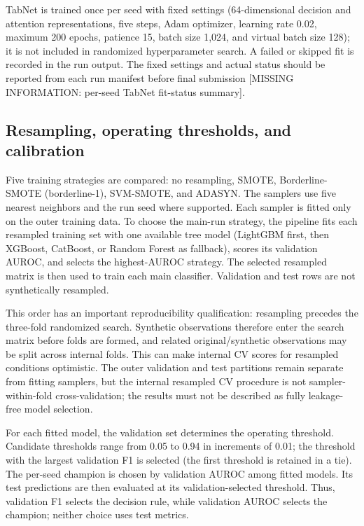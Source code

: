 \documentclass[pdflatex,sn-mathphys-num]{sn-jnl}
\begin{document}
TabNet is trained once per seed with fixed settings (64-dimensional decision and attention representations, five steps, Adam optimizer, learning rate 0.02, maximum 200 epochs, patience 15, batch size 1,024, and virtual batch size 128); it is not included in randomized hyperparameter search. A failed or skipped fit is recorded in the run output. The fixed settings and actual status should be reported from each run manifest before final submission [MISSING INFORMATION: per-seed TabNet fit-status summary].

\subsection{Resampling, operating thresholds, and calibration}
Five training strategies are compared: no resampling, SMOTE, Borderline-SMOTE (borderline-1), SVM-SMOTE, and ADASYN. The samplers use five nearest neighbors and the run seed where supported. Each sampler is fitted only on the outer training data. To choose the main-run strategy, the pipeline fits each resampled training set with one available tree model (LightGBM first, then XGBoost, CatBoost, or Random Forest as fallback), scores its validation AUROC, and selects the highest-AUROC strategy. The selected resampled matrix is then used to train each main classifier. Validation and test rows are not synthetically resampled.

This order has an important reproducibility qualification: resampling precedes the three-fold randomized search. Synthetic observations therefore enter the search matrix before folds are formed, and related original/synthetic observations may be split across internal folds. This can make internal CV scores for resampled conditions optimistic. The outer validation and test partitions remain separate from fitting samplers, but the internal resampled CV procedure is not sampler-within-fold cross-validation; the results must not be described as fully leakage-free model selection.

For each fitted model, the validation set determines the operating threshold. Candidate thresholds range from 0.05 to 0.94 in increments of 0.01; the threshold with the largest validation F1 is selected (the first threshold is retained in a tie). The per-seed champion is chosen by validation AUROC among fitted models. Its test predictions are then evaluated at its validation-selected threshold. Thus, validation F1 selects the decision rule, while validation AUROC selects the champion; neither choice uses test metrics.
\end{document}
